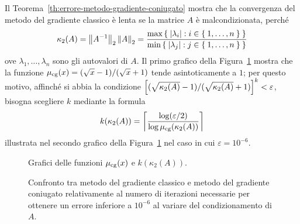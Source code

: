 	\begin{osservazione}
		Il Teorema~\ref{th:errore-metodo-gradiente-coniugato} mostra che la convergenza del metodo del gradiente classico è lenta se la matrice \(A\) è malcondizionata, perché
		\begin{equation*}
			\kappa_2 (A) = \norm{A^{-1}}_2 \, \norm{A}_2 = \frac{\max \Set{\abs{\lambda_i} : i \in \Set{1, \dots, n}}}{\min \Set{\abs{\lambda_j} : j \in \Set{1, \dots, n}}}
		\end{equation*}
		ove \(\lambda_1, \dots, \lambda_n\) sono gli autovalori di \(A\). Il primo grafico della Figura~\ref{fig:condiz-grad-coniugato} mostra che la funzione \(\mu_\textup{cg} (x) = (\sqrt{x} - 1) / (\sqrt{x} + 1)\) tende asintoticamente a \(1\); per questo motivo, affinché si abbia la condizione \(\qty[(\sqrt{\kappa_2 (A)} - 1) / (\sqrt{\kappa_2 (A)} + 1)]^k < \varepsilon\), bisogna scegliere \(k\) mediante la formula
		\begin{equation*}
			k (\kappa_2 (A)) = \left\lceil \frac{\log(\varepsilon / 2)}{\log \mu_\textup{cg} (\kappa_2 (A))} \right\rceil
		\end{equation*}
		illustrata nel secondo grafico della Figura~\ref{fig:condiz-grad-coniugato} nel caso in cui \(\varepsilon = 10^{-6}\).
		
		\begin{figure}[tpb]
			\centering
			\caption{Grafici delle funzioni \(\mu_\textup{cg} (x)\) e \(k (\kappa_2 (A))\).}\label{fig:condiz-grad-coniugato}
		\end{figure}
		
		\begin{figure}[tpb]
			\centering
			
			
			\caption{Confronto tra metodo del gradiente classico e metodo del gradiente coniugato relativamente al numero di iterazioni necessarie per ottenere un errore inferiore a \(10^{-6}\) al variare del condizionamento di \(A\).}\label{fig:confronto-grad}
		\end{figure}
	\end{osservazione}
